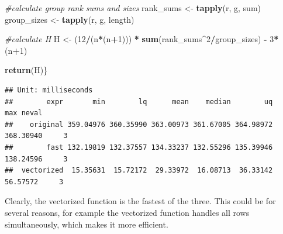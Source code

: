 \documentclass[
]{article}
\newenvironment{Shaded}{\begin{snugshade}}{\end{snugshade}}
\newcommand{\AttributeTok}[1]{\textcolor[rgb]{0.13,0.29,0.53}{#1}}
\newcommand{\CommentTok}[1]{\textcolor[rgb]{0.56,0.35,0.01}{\textit{#1}}}
\newcommand{\ControlFlowTok}[1]{\textcolor[rgb]{0.13,0.29,0.53}{\textbf{#1}}}
\newcommand{\DecValTok}[1]{\textcolor[rgb]{0.00,0.00,0.81}{#1}}
\newcommand{\FunctionTok}[1]{\textcolor[rgb]{0.13,0.29,0.53}{\textbf{#1}}}
\newcommand{\NormalTok}[1]{#1}
\newcommand{\OtherTok}[1]{\textcolor[rgb]{0.56,0.35,0.01}{#1}}
\newcommand{\SpecialCharTok}[1]{\textcolor[rgb]{0.81,0.36,0.00}{\textbf{#1}}}
\begin{document}
\begin{Shaded}
\begin{Highlighting}[]
  \CommentTok{\#calculate group rank sums and sizes}
\NormalTok{  rank\_sums }\OtherTok{\textless{}{-}} \FunctionTok{tapply}\NormalTok{(r, g, sum)}
\NormalTok{  group\_sizes }\OtherTok{\textless{}{-}} \FunctionTok{tapply}\NormalTok{(r, g, length)}

  \CommentTok{\#calculate H}
\NormalTok{  H }\OtherTok{\textless{}{-}}\NormalTok{ (}\DecValTok{12}\SpecialCharTok{/}\NormalTok{(n}\SpecialCharTok{*}\NormalTok{(n}\SpecialCharTok{+}\DecValTok{1}\NormalTok{))) }\SpecialCharTok{*} \FunctionTok{sum}\NormalTok{(rank\_sums}\SpecialCharTok{\^{}}\DecValTok{2}\SpecialCharTok{/}\NormalTok{group\_sizes) }\SpecialCharTok{{-}} \DecValTok{3}\SpecialCharTok{*}\NormalTok{(n}\SpecialCharTok{+}\DecValTok{1}\NormalTok{)}
  
  \FunctionTok{return}\NormalTok{(H)\}}
\end{Highlighting}
\end{Shaded}

\begin{Shaded}
\end{Shaded}

\begin{verbatim}
## Unit: milliseconds
##        expr       min        lq      mean    median        uq       max neval
##    original 359.04976 360.35990 363.00973 361.67005 364.98972 368.30940     3
##        fast 132.19819 132.37557 134.33237 132.55296 135.39946 138.24596     3
##  vectorized  15.35631  15.72172  29.33972  16.08713  36.33142  56.57572     3
\end{verbatim}

Clearly, the vectorized function is the fastest of the three. This could
be for several reasons, for example the vectorized function handles all
rows simultaneously, which makes it more efficient.
\end{document}
